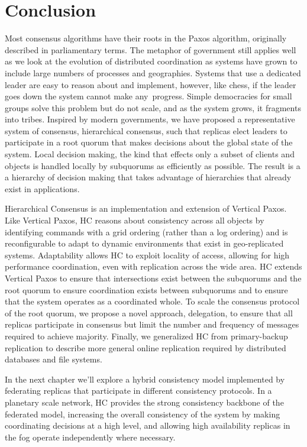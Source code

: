 \section{Conclusion}
\label{ch03_conclusion}

Most consensus algorithms have their roots in the Paxos algorithm, originally described in parliamentary terms.
The metaphor of government still applies well as we look at the evolution of distributed coordination as systems have grown to include large numbers of processes and geographies.
Systems that use a dedicated leader are easy to reason about and implement, however, like chess, if the leader goes down the system cannot make any\ progress.
Simple democracies for small groups solve this problem but do not scale, and as the system grows, it fragments into tribes.
Inspired by modern governments, we have proposed a representative system of consensus, hierarchical consensus, such that replicas elect leaders to participate in a root quorum that makes decisions about the global state of the system.
Local decision making, the kind that effects only a subset of clients and objects is handled locally by subquorums as efficiently as possible.
The result is a a hierarchy of decision making that takes advantage of hierarchies that already exist in applications.

Hierarchical Consensus is an implementation and extension of Vertical Paxos.
Like Vertical Paxos, HC reasons about consistency across all objects by identifying commands with a grid ordering (rather than a log ordering) and is reconfigurable to adapt to dynamic environments that exist in geo-replicated systems.
Adaptability allows HC to exploit locality of access, allowing for high performance coordination, even with replication across the wide area.
HC extends Vertical Paxos to ensure that intersections exist between the subquorums and the root quorum to ensure coordination exists between subquorums and to ensure that the system operates as a coordinated whole.
To scale the consensus protocol of the root quorum, we propose a novel approach, delegation, to ensure that all replicas participate in consensus but limit the number and frequency of messages required to achieve majority.
Finally, we generalized HC from primary-backup replication to describe more general online replication required by distributed databases and file systems.

In the next chapter we'll explore a hybrid consistency model implemented by federating replicas that participate in different consistency protocols.
In a planetary scale network, HC provides the strong consistency backbone of the federated model, increasing the overall consistency of the system by making coordinating decisions at a high level, and allowing high availability replicas in the fog operate independently where necessary.
